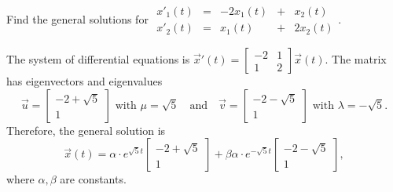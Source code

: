 \documentclass[../main.tex]{subfiles}
\begin{document}
\begin{exercise}
  Find the general solutions for
  \(
  \begin{array}{rcrcr}
    x'_{1}(t) &=& -2 x_{1}(t) &+&  x_{2}(t) \\
    x'_{2}(t) &=&    x_{1}(t) &+& 2x_{2}(t)
  \end{array}
  \).

  \begin{solution}
    The system of differential equations is \(\vec{x}'(t) = \begin{bmatrix} -2 & 1 \\ 1 & 2 \end{bmatrix} \vec{x}(t)\). The matrix has eigenvectors and eigenvalues
    \[
      \vec{u} = \begin{bmatrix}
        -2 + \sqrt{5} \\
        1
      \end{bmatrix}
      \text{ with \(\mu = \sqrt{5}\)}
      \quad\text{and}\quad
      \vec{v} = \begin{bmatrix}
        -2 - \sqrt{5} \\
        1
      \end{bmatrix}
      \text{ with \(\lambda = -\sqrt{5}\)}.
    \]
    Therefore, the general solution is
    \[
      \vec{x}(t) = 
      \alpha \cdot e^{\sqrt{5}t}
      \begin{bmatrix}
        -2 + \sqrt{5} \\
        1
      \end{bmatrix}
      + 
      \beta \alpha \cdot e^{-\sqrt{5}t}
      \begin{bmatrix}
        -2 - \sqrt{5} \\
        1
      \end{bmatrix},
    \]
    where \(\alpha,\beta\) are constants.

  \end{solution}
\end{exercise}
\end{document}
